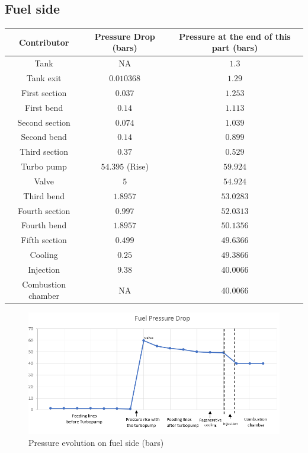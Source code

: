 \subsection{Fuel side}
\begin{tabular}[H]{|c|c|c|}
	\hline
	\cellcolor{gray!50}Contributor& \cellcolor{gray!50}Pressure Drop (bars) & \cellcolor{gray!50}Pressure at the end of this part (bars)\\
	\hline
	Tank & NA & $1.3$ \\
	\hline
	Tank exit & $0.010368$ & $1.29$\\
	\hline
	First section & $0.037$ &$1.253$\\
	\hline
	First bend &$0.14$ &$1.113$\\
	\hline
	Second section &$0.074$ &$1.039$\\
	\hline
	Second bend &$0.14$ &$0.899$\\
	\hline
	Third section &$0.37$ &$0.529$\\
	\hline
	Turbo pump & $54.395 $ (Rise) &$59.924$\\
	\hline
	Valve & $5$ &$54.924$\\
	\hline
	Third bend &$1.8957$ &$53.0283$\\
	\hline
	Fourth section &$0.997$ &$52.0313$\\
	\hline
	Fourth bend &$1.8957$ &$50.1356$\\
	\hline
	Fifth section &$0.499$ &$49.6366$\\
	\hline
	Cooling &$0.25$ &$49.3866$\\
	\hline
	Injection &$9.38$ &$40.0066$\\
	\hline
	Combustion chamber & NA &$40.0066$\\
	\hline
\end{tabular}
\begin{figure}[H]
	\centering
	\includegraphics[width=\linewidth]{fuelchart}
	\caption{Pressure evolution on fuel side (bars)}
\end{figure}
